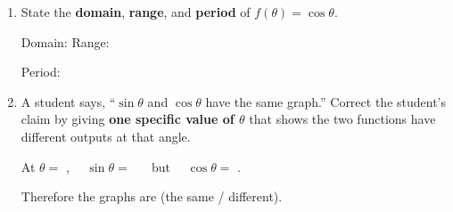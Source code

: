 \documentclass[10pt]{article}
\begin{document}
\namedateperiod

\vspace{0.15in}

\begin{enumerate}[leftmargin=1.5em, itemsep=14pt]

  \item State the \textbf{domain}, \textbf{range}, and \textbf{period} of
        $f(\theta) = \cos\theta$.

        \vspace{4pt}
        Domain: \blank{5cm} \quad Range: \blank{5cm}

        \vspace{8pt}
        Period: \blank{4cm}

  \item A student says, ``$\sin\theta$ and $\cos\theta$ have the same graph.''
        Correct the student's claim by giving \textbf{one specific value of $\theta$}
        that shows the two functions have different outputs at that angle.

        \vspace{6pt}
        At $\theta = $ \blank{2cm}, $\quad \sin\theta = $ \blank{2cm}
        $\quad$ but $\quad \cos\theta = $ \blank{2cm}.

        \vspace{8pt}
        Therefore the graphs are \blank{4cm} (the same / different).

        \vspace{6pt}

\end{enumerate}
\end{document}
